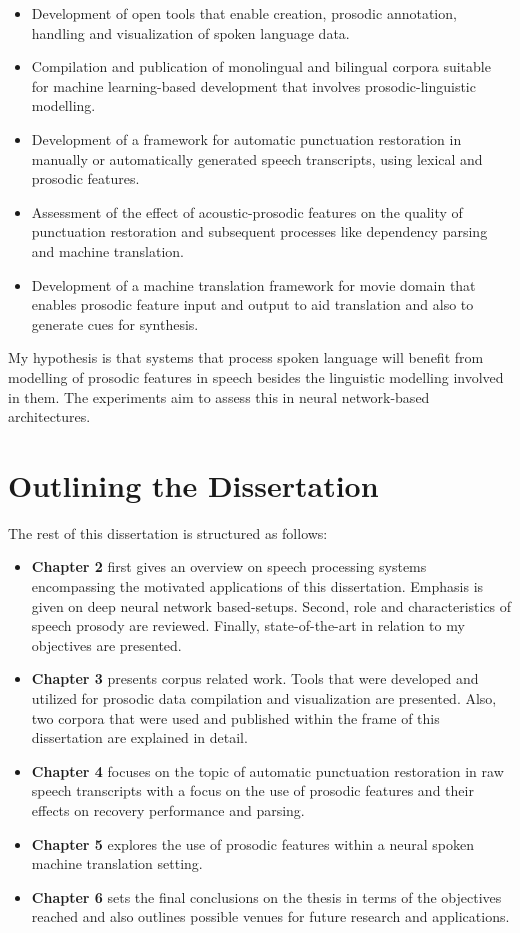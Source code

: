 \begin{itemize}
    \item Development of open tools that enable creation, prosodic annotation, handling and visualization of spoken language data.
    \item Compilation and publication of monolingual and bilingual corpora suitable for machine learning-based development that involves prosodic-linguistic modelling.
    \item Development of a framework for automatic punctuation restoration in  manually or automatically generated speech transcripts, using lexical and prosodic features.
    \item Assessment of the effect of acoustic-prosodic features on the quality of punctuation restoration and subsequent processes like dependency parsing and machine translation.
    \item Development of a machine translation framework for movie domain that enables prosodic feature input and output to aid translation and also to generate cues for synthesis.
\end{itemize}

My hypothesis is that systems that process spoken language will benefit from  modelling of prosodic features in speech besides the linguistic modelling involved in them. The experiments aim to assess this in neural network-based architectures. 

\section{Outlining the Dissertation}

The rest of this dissertation is structured as follows:

\begin{itemize}
    \item \textbf{Chapter 2} first gives an overview on speech processing systems encompassing the motivated applications of this dissertation. Emphasis is given on deep neural network based-setups. Second, role and characteristics of speech prosody are reviewed. Finally, state-of-the-art in relation to my objectives are presented. 
    \item \textbf{Chapter 3} presents corpus related work. Tools that were developed and utilized for prosodic data compilation and visualization are presented. Also, two corpora that were used and published within the frame of this dissertation are explained in detail. 
    \item \textbf{Chapter 4} focuses on the topic of automatic punctuation restoration in raw speech transcripts with a focus on the use of prosodic features and their effects on recovery performance and parsing.
    \item \textbf{Chapter 5} explores the use of prosodic features within a neural spoken machine translation setting. 
    \item \textbf{Chapter 6} sets the final conclusions on the thesis in terms of the objectives reached and also outlines possible venues for future research and applications. 
\end{itemize}


